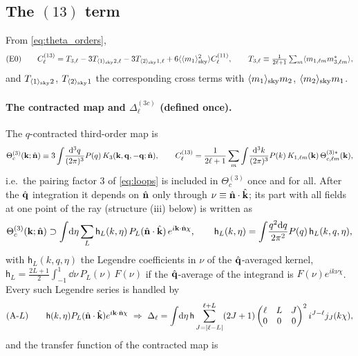 \subsection{The \texorpdfstring{$(13)$}{(13)} term}
\label{sec:thirteen}
From \eqref{eq:theta_orders},
\begin{equation}
\text{(E0)}\qquad C^{(13)}_\ell=T_{3,\ell}-3T_{\langle 1\rangle_{\rm sky} 2,\ell}-3T_{\langle 2\rangle_{\rm sky} 1,\ell}+6\langle\langle m_1\rangle_{\rm sky}^2\rangle C^{(11)}_\ell,\qquad
T_{3,\ell}\equiv\tfrac1{2\ell+1}\textstyle\sum_m\langle m_{1,\ell m}m^*_{3,\ell m}\rangle,
\label{eq:E0}
\end{equation}
and $T_{\langle 1\rangle_{\rm sky}2}$, $T_{\langle 2\rangle_{\rm sky}1}$ the corresponding cross terms with $\langle m_1\rangle_{\rm sky}m_2$, $\langle m_2\rangle_{\rm sky}m_1$.

\paragraph{The contracted map and $\Delta^{(3c)}_\ell$ (defined once).}  The $q$-contracted third-order map is
\begin{equation}
\Theta^{(3)}_c(\mathbf k;\hat{\mathbf n})\equiv3\int\!\frac{\mathrm d^3q}{(2\pi)^3}P(q)\,K_3(\mathbf k,\mathbf q,-\mathbf q;\hat{\mathbf n}),\qquad
C^{(13)}_\ell=\frac1{2\ell+1}\sum_m\int\!\frac{\mathrm d^3k}{(2\pi)^3}P(k)\,K_{1,\ell m}(\mathbf k)\,\Theta^{(3)*}_{c,\ell m}(\mathbf k),
\label{eq:Theta3c}
\end{equation}
i.e.\ the pairing factor 3 of \eqref{eq:loops} is included in $\Theta^{(3)}_c$ once and for all.  After the $\hat{\mathbf q}$ integration it depends on
$\hat{\mathbf n}$ only through $\nu\equiv\hat{\mathbf n}\cdot\hat{\mathbf k}$; its part with all fields at one point of the ray (structure (iii) below) is written as
\begin{equation}
\Theta^{(3)}_c(\mathbf k;\hat{\mathbf n})\supset\int\!\mathrm d\eta\sum_L\mathsf h_L(k,\eta)\,P_L(\hat{\mathbf n}\cdot\hat{\mathbf k})\,e^{i\mathbf k\cdot\hat{\mathbf n}\chi},\qquad
\mathsf h_L(k,\eta)=\int\!\frac{q^2\mathrm d q}{2\pi^2}P(q)\,\mathsf h_L(k,q,\eta),
\label{eq:hL}
\end{equation}
with $\mathsf h_L(k,q,\eta)$ the Legendre coefficients in $\nu$ of the $\hat{\mathbf q}$-averaged kernel, $\mathsf h_L=\frac{2L+1}2\int_{-1}^1\dd\nu\,P_L(\nu)\,F(\nu)$ if
the $\hat{\mathbf q}$-average of the integrand is $F(\nu)e^{ik\nu\chi}$.  Every such Legendre series is handled by
\begin{equation}
\text{(A-$L$)}\qquad \mathsf h(k,\eta)P_L(\hat{\mathbf n}\cdot\hat{\mathbf k})e^{i\mathbf k\cdot\hat{\mathbf n}\chi}\ \Rightarrow\
\Delta_\ell=\int\!\mathrm d\eta\,\mathsf h\sum_{J=|\ell-L|}^{\ell+L}(2J+1)\begin{pmatrix}\ell&L&J\\0&0&0\end{pmatrix}^2i^{J-\ell}j_J(k\chi),
\label{eq:AL}
\end{equation}
and the transfer function of the contracted map is
